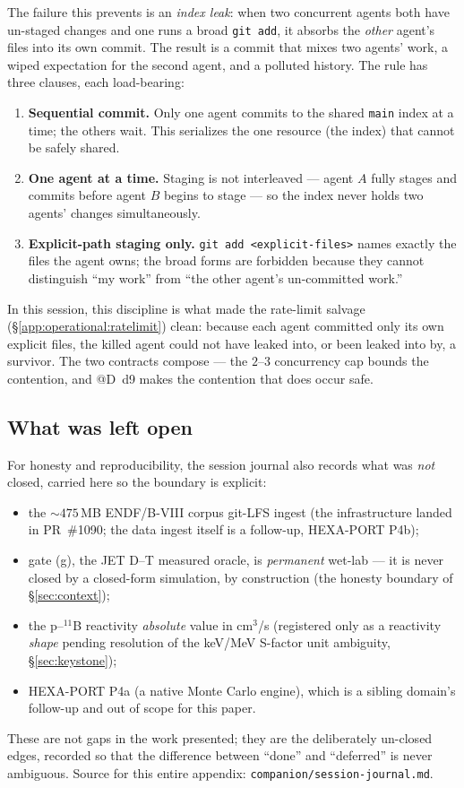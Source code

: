 The failure this prevents is an \emph{index leak}: when two concurrent
agents both have un-staged changes and one runs a broad
\verb|git add|, it absorbs the \emph{other} agent's files into its own
commit. The result is a commit that mixes two agents' work, a wiped
expectation for the second agent, and a polluted history. The rule has
three clauses, each load-bearing:
\begin{enumerate}
  \item \textbf{Sequential commit.} Only one agent commits to the shared
        \texttt{main} index at a time; the others wait. This serializes
        the one resource (the index) that cannot be safely shared.
  \item \textbf{One agent at a time.} Staging is not interleaved ---
        agent $A$ fully stages and commits before agent $B$ begins to
        stage --- so the index never holds two agents' changes
        simultaneously.
  \item \textbf{Explicit-path staging only.}
        \verb|git add <explicit-files>| names exactly the files the agent
        owns; the broad forms are forbidden because they cannot
        distinguish ``my work'' from ``the other agent's un-committed
        work.''
\end{enumerate}
In this session, this discipline is what made the rate-limit salvage
(\S\ref{app:operational:ratelimit}) clean: because each agent committed
only its own explicit files, the killed agent could not have leaked
into, or been leaked into by, a survivor. The two contracts compose ---
the $2$--$3$ concurrency cap bounds the contention, and @D~d9 makes the
contention that does occur safe.

\subsection{What was left open}
\label{app:operational:deferred}

For honesty and reproducibility, the session journal also records what
was \emph{not} closed, carried here so the boundary is explicit:
\begin{itemize}
  \item the $\sim475$\,MB ENDF/B-VIII corpus git-LFS ingest (the
        infrastructure landed in PR~\#1090; the data ingest itself is a
        follow-up, HEXA-PORT P4b);
  \item gate (g), the JET D--T measured oracle, is \emph{permanent}
        wet-lab --- it is never closed by a closed-form simulation, by
        construction (the honesty boundary of \S\ref{sec:context});
  \item the p--$^{11}$B reactivity \emph{absolute} value in cm$^3$/s
        (registered only as a reactivity \emph{shape} pending resolution
        of the keV/MeV S-factor unit ambiguity, \S\ref{sec:keystone});
  \item HEXA-PORT P4a (a native Monte Carlo engine), which is a sibling
        domain's follow-up and out of scope for this paper.
\end{itemize}
These are not gaps in the work presented; they are the deliberately
un-closed edges, recorded so that the difference between ``done'' and
``deferred'' is never ambiguous. Source for this entire appendix:
\texttt{companion/session-journal.md}.
